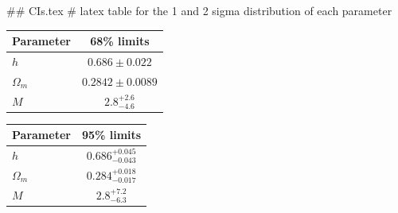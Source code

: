 ## CIs.tex
# latex table for the 1 and 2 sigma distribution of each parameter

\begin{tabular} { l  c}
 Parameter &  68\% limits\\
\hline
{\boldmath$h              $} & $0.686\pm 0.022            $\\
{\boldmath$\Omega_m       $} & $0.2842\pm 0.0089          $\\
{\boldmath$M              $} & $2.8^{+2.6}_{-4.6}         $\\
\hline
\end{tabular}

\begin{tabular} { l  c}
 Parameter &  95\% limits\\
\hline
{\boldmath$h              $} & $0.686^{+0.045}_{-0.043}   $\\
{\boldmath$\Omega_m       $} & $0.284^{+0.018}_{-0.017}   $\\
{\boldmath$M              $} & $2.8^{+7.2}_{-6.3}         $\\
\hline
\end{tabular}
